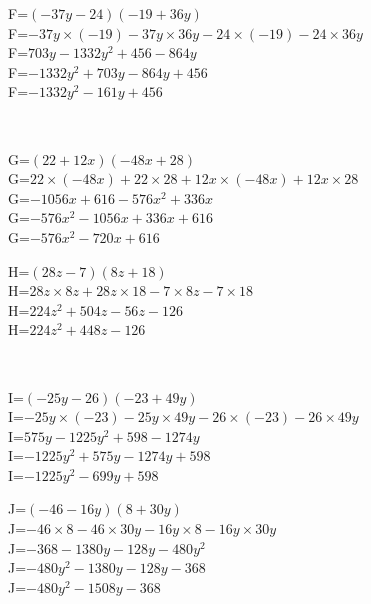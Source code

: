 \documentclass{article}%
\begin{document}
\begin{minipage}{0.5\textwidth}%
F=$(-37y-24)(-19+36y)$\\%
F=$-37y \times (-19)-37y \times 36y-24 \times (-19)-24 \times 36y$\\%
F=$703y-1332y^2+456-864y$\\%
F=$-1332y^2+703y-864y+456$\\%
F=$-1332y^2-161y+456$\\%
\end{minipage}%
\\%
\begin{minipage}{0.5\textwidth}%
G=$(22+12x)(-48x+28)$\\%
G=$22 \times (-48x)+22 \times 28+12x \times (-48x)+12x \times 28$\\%
G=$-1056x+616-576x^2+336x$\\%
G=$-576x^2-1056x+336x+616$\\%
G=$-576x^2-720x+616$\\%
\end{minipage}%
\begin{minipage}{0.5\textwidth}%
H=$(28z-7)(8z+18)$\\%
H=$28z \times 8z+28z \times 18-7 \times 8z-7 \times 18$\\%
H=$224z^2+504z-56z-126$\\%
H=$224z^2+448z-126$\\%
\end{minipage}%
\\%
\begin{minipage}{0.5\textwidth}%
I=$(-25y-26)(-23+49y)$\\%
I=$-25y \times (-23)-25y \times 49y-26 \times (-23)-26 \times 49y$\\%
I=$575y-1225y^2+598-1274y$\\%
I=$-1225y^2+575y-1274y+598$\\%
I=$-1225y^2-699y+598$\\%
\end{minipage}%
\begin{minipage}{0.5\textwidth}%
J=$(-46-16y)(8+30y)$\\%
J=$-46 \times 8-46 \times 30y-16y \times 8-16y \times 30y$\\%
J=$-368-1380y-128y-480y^2$\\%
J=$-480y^2-1380y-128y-368$\\%
J=$-480y^2-1508y-368$\\%
\end{minipage}%
\\

%
\end{document}
